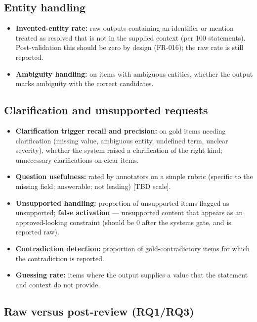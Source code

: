 \documentclass[
  11pt,a4paper,oneside]{report}
\providecommand{\tightlist}{%
  \setlength{\itemsep}{0pt}\setlength{\parskip}{0pt}}
\begin{document}
\hypertarget{entity-handling}{%
\subsection{Entity handling}\label{entity-handling}}

\begin{itemize}
\tightlist
\item
  \textbf{Invented-entity rate:} raw outputs containing an identifier or
  mention treated as resolved that is not in the supplied context (per
  100 statements). Post-validation this should be zero by design
  (FR-016); the raw rate is still reported.
\item
  \textbf{Ambiguity handling:} on items with ambiguous entities, whether
  the output marks ambiguity with the correct candidates.
\end{itemize}

\hypertarget{clarification-and-unsupported-requests}{%
\subsection{Clarification and unsupported
requests}\label{clarification-and-unsupported-requests}}

\begin{itemize}
\tightlist
\item
  \textbf{Clarification trigger recall and precision:} on gold items
  needing clarification (missing value, ambiguous entity, undefined
  term, unclear severity), whether the system raised a clarification of
  the right kind; unnecessary clarifications on clear items.
\item
  \textbf{Question usefulness:} rated by annotators on a simple rubric
  (specific to the missing field; answerable; not leading) {[}TBD
  scale{]}.
\item
  \textbf{Unsupported handling:} proportion of unsupported items flagged
  as unsupported; \textbf{false activation} --- unsupported content that
  appears as an approved-looking constraint (should be 0 after the
  system\textquotesingle s gate, and is reported raw).
\item
  \textbf{Contradiction detection:} proportion of gold-contradictory
  items for which the contradiction is reported.
\item
  \textbf{Guessing rate:} items where the output supplies a value that
  the statement and context do not provide.
\end{itemize}

\hypertarget{raw-versus-post-review-rq1rq3}{%
\subsection{Raw versus post-review
(RQ1/RQ3)}\label{raw-versus-post-review-rq1rq3}}
\end{document}

